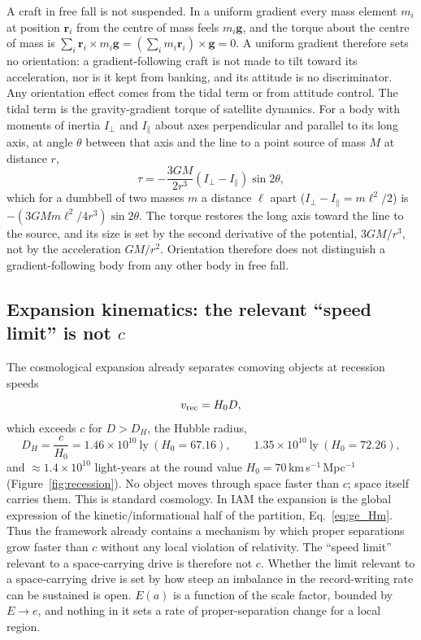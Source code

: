 A craft in free fall is not suspended. In a uniform gradient every mass element $m_i$ at position $\mathbf r_i$ from the centre of mass feels
$m_i\mathbf g$, and the torque about the centre of mass is $\sum_i\mathbf r_i\times m_i\mathbf g=(\sum_i m_i\mathbf r_i)\times\mathbf g=0$. A uniform
gradient therefore sets no orientation: a gradient-following craft is not made to tilt toward its acceleration, nor is it kept from banking, and its
attitude is no discriminator. \derived{} Any orientation effect comes from the tidal term or from attitude control. The tidal term is the
gravity-gradient torque of satellite dynamics. For a body with moments of inertia $I_\perp$ and $I_\parallel$ about axes perpendicular and parallel to
its long axis, at angle $\theta$ between that axis and the line to a point source of mass $M$ at distance $r$,
\begin{equation}
\tau=-\frac{3GM}{2r^3}\left(I_\perp-I_\parallel\right)\sin2\theta ,
\label{eq:ge_ggtorque}
\end{equation}
which for a dumbbell of two masses $m$ a distance $\ell$ apart ($I_\perp-I_\parallel=m\ell^2/2$) is $-(3GMm\ell^2/4r^3)\sin2\theta$. \derived{} The
torque restores the long axis toward the line to the source, and its size is set by the second derivative of the potential, $3GM/r^3$, not by the
acceleration $GM/r^2$. Orientation therefore does not distinguish a gradient-following body from any other body in free fall. \derived

\subsection{Expansion kinematics: the relevant ``speed limit'' is not \texorpdfstring{$c$}{c}}\label{sec:ge_expansion}
The cosmological expansion already separates comoving objects at recession speeds
\begin{equation}
v_{\rm rec}=H_0D ,
\label{eq:ge_vrec}
\end{equation}
which exceeds $c$ for $D>D_H$, the Hubble radius,
\begin{equation}
D_H=\frac{c}{H_0}=1.46\times10^{10}\ \text{ly}\ (H_0=67.16),\qquad 1.35\times10^{10}\ \text{ly}\ (H_0=72.26),
\label{eq:ge_DH}
\end{equation}
and $\approx1.4\times10^{10}$ light-years at the round value $H_0=70$\,km\,s$^{-1}$\,Mpc$^{-1}$ (Figure~\ref{fig:recession}). \calc{} No object moves
through space faster than $c$; space itself carries them. This is standard cosmology. In IAM the expansion is the global expression of the
kinetic/informational half of the partition, Eq.~\eqref{eq:ge_Hm}. \interp{} Thus the framework already contains a mechanism by which proper
separations grow faster than $c$ without any local violation of relativity. The ``speed limit'' relevant to a space-carrying drive is therefore not $c$. Whether the limit relevant to a space-carrying drive is set by how steep an
imbalance in the record-writing rate can be sustained is open. $E(a)$ is a function of the scale factor, bounded by $E\to e$, and nothing in it sets a
rate of proper-separation change for a local region. \openprob

